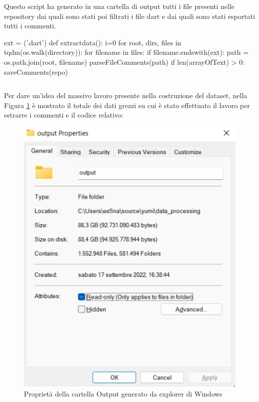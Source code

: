 Questo script ha generato in una cartella di output tutti i file presenti nelle repository dai quali sono stati poi filtrati i file dart e dai quali sono stati esportati tutti i commenti.
\begin{python}
ext = ('.dart')
def extractdata():
    i=0
    for root, dirs, files in tqdm(os.walk(directory)):
        for filename in files:
            if filename.endswith(ext):
                path = os.path.join(root, filename)
                parseFileComments(path)
                if len(arrayOfText) > 0:
                    saveComments(repo)
\end{python}
\begin{lstlisting}[frame=none,caption={Un'estratto del codice per l'estrazione dei commenti dai file \texttt{.dart}},captionpos=b,label=pythonextractcomment]
\end{lstlisting}
Per dare un'idea del massivo lavoro presente nella costruzione del dataset, nella Figura \ref{figexplorer} è mostrato il totale dei dati grezzi su cui è stato effettuato il lavoro per estrarre i commenti e il codice relativo:
\begin{figure}[h!]
\centerline{\includegraphics[scale=.75]{immagini/outputFolderProperties.png}}
\caption{Proprietà della cartella Output generato da explorer di Windows}
\label{figexplorer}
\end{figure}
